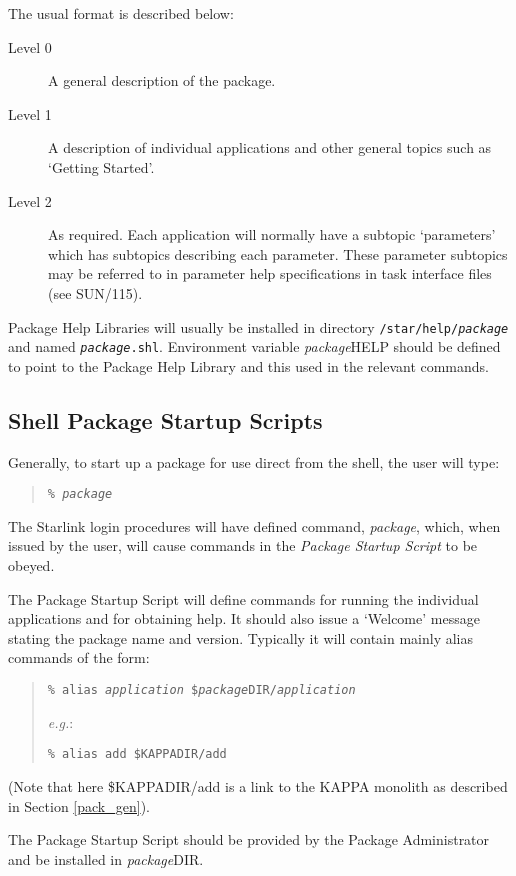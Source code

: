 \documentclass[twoside,11pt]{article}
\newcommand{\xref}[3]{#1}
\newcommand{\xlabel}[1]{}
\renewcommand{\_}{\texttt{\symbol{95}}}
\begin{document}
The usual format is described below:
\begin{description}
\item[Level 0] A general description of the package.
\item[Level 1] A description of individual applications and other general
topics such as `Getting Started'.
\item[Level 2] As required. Each application will normally have a
subtopic `parameters' which has subtopics describing each parameter.
These parameter subtopics may be referred to in parameter help
specifications in task interface files (see
\xref{SUN/115}{sun115}{}).
\end{description}
Package Help Libraries will usually be installed in directory
\texttt{/star/help/\textit{package}} and named \texttt{\textit{package}.shl}.
Environment variable \textit{package}\_HELP should be defined to point to the
Package Help Library and this used in the relevant commands.

\subsection{\xlabel{shell_package_startup_scripts}Shell Package Startup Scripts}
Generally, to start up a package for use direct from the shell, the
user will type:
\begin{quote}
\texttt{\% \textit{package}}
\end{quote}
The Starlink login procedures will have defined command, \textit{package}, which,
when issued by the user, will cause commands in the \textit{Package Startup
Script} to be obeyed.

The Package Startup Script will define commands for
running the individual applications and for obtaining help.
It should also issue a `Welcome' message stating the package name and version.
Typically it will contain mainly alias commands of the form:
\begin{quote}
\texttt{\% alias
\textit{application} \$\textit{package}\_DIR/\textit{application}}

\textit{e.g.}:

\texttt{\% alias add \$KAPPA\_DIR/add}
\end{quote}
(Note that here \$KAPPA\_DIR/add is a link to the KAPPA monolith as described
in Section \ref{pack_gen}).

The Package Startup Script should be provided by the Package Administrator and
be installed in \textit{package}\_DIR.
\end{document}
